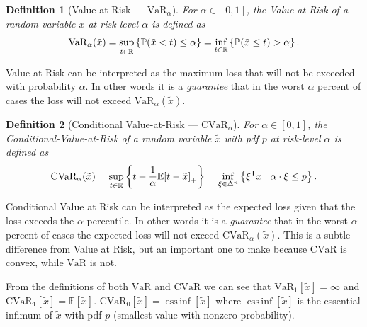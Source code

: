 \documentclass[10pt]{article}
\newtheorem{definition}{Definition}
\newcommand{\cvar}{\text{CVaR}}
\newcommand{\cvaralpha}{\text{CVaR}_\alpha}
\newcommand{\var}{\text{VaR}}
\newcommand{\varalpha}{\text{VaR}_\alpha}
\theoremstyle{plain}
\theoremstyle{remark}
\DeclareMathOperator*{\essinf}{ess\,inf}
\begin{document}
\begin{definition}[Value-at-Risk --- $\varalpha$]\label{def:var}
        For $\alpha \in [0, 1]$, the Value-at-Risk of a random variable 
        $\tilde{x}$ at risk-level $\alpha$ is defined as
        \[
                \normalfont{\varalpha(\tilde{x})} = \sup_{t \in \Real} \left\{ \mathbb{P}(\tilde{x} < t) \leq \alpha \right\} = \inf_{t \in \Real} \left\{ \mathbb{P}(\tilde{x} \leq t) > \alpha \right\}.
        \]
\end{definition}

Value at Risk can be interpreted as the maximum loss that will not be exceeded with probability $\alpha$. In other
words it is a \emph{guarantee} that in the worst $\alpha$ percent of cases the loss will not exceed $\varalpha(\tilde{x})$.

\begin{definition}[Conditional Value-at-Risk --- $\cvaralpha$]\label{def:cvar}
        For $\alpha \in [0, 1]$, the Conditional-Value-at-Risk of a random variable 
        $\tilde{x}$ with pdf $p$ at risk-level $\alpha$ is defined as
        \[
                \normalfont{\cvaralpha(\tilde{x})} = \sup_{t \in \Real} \left\{ t - \frac{1}{\alpha} \mathbb{E}{[t - \tilde{x}]}_+ \right\} =
                \inf_{\xi \in \Delta^n} \left\{ \xi\tr x \mid \alpha \cdot \xi \leq p \right\}.
        \]
\end{definition}

Conditional Value at Risk can be interpreted as the expected loss given that the loss exceeds the $\alpha$ percentile. 
In other words it is a \emph{guarantee} that in the worst $\alpha$ percent of cases the expected loss will not exceed $\cvaralpha(\tilde{x})$.
This is a subtle difference from Value at Risk, but an important one to make because $\cvar$ is convex, while $\var$ is
not.

From the definitions of both $\var$ and $\cvar$ we can see that $\var_1[\tilde{x}] = \infty$ and $\cvar_1[\tilde{x}] = \mathbb{E}[\tilde{x}]$.
$\cvar_0[\tilde{x}] = \essinf[\tilde{x}]$ where $\essinf[\tilde{x}]$ is the essential infimum of $\tilde{x}$ with pdf $p$ (smallest value with nonzero probability).
\end{document}
